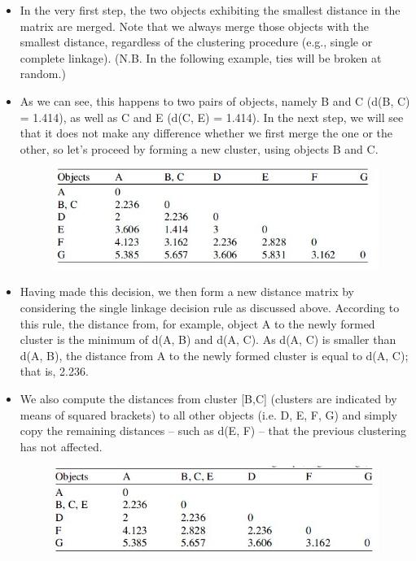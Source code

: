 \begin{itemize}
	\item In the very first step, the two
	objects exhibiting the smallest distance in the matrix are merged. Note that we
	always merge those objects with the smallest distance, regardless of the clustering
	procedure (e.g., single or complete linkage). (N.B. In the following example, ties will be broken at random.)
	\item As we can see, this happens to two
	pairs of objects, namely B and C (d(B, C) = 1.414), as well as C and E (d(C, E) =
	1.414). In the next step, we will see that it does not make any difference whether we
	first merge the one or the other, so let’s proceed by forming a new cluster, using
	objects B and C.
	\begin{figure}[h!]
		\begin{center}
			\includegraphics[scale=0.6]{images/DistanceMatrix2.jpg}\\
		\end{center}
	\end{figure}
	\item Having made this decision, we then form a new distance matrix by considering
	the single linkage decision rule as discussed above. According to this rule, the
	distance from, for example, object A to the newly formed cluster is the minimum of
	d(A, B) and d(A, C). As d(A, C) is smaller than d(A, B), the distance from A to the
	newly formed cluster is equal to d(A, C); that is, 2.236.
	\item We also compute the
	distances from cluster [B,C] (clusters are indicated by means of squared brackets)
	to all other objects (i.e. D, E, F, G) and simply copy the remaining distances – such
	as d(E, F) – that the previous clustering has not affected.
	\begin{figure}[h!]
		\begin{center}
			\includegraphics[scale=0.6]{images/DistanceMatrix3.jpg}\\

\end{center}
\end{figure}
\end{itemize}
